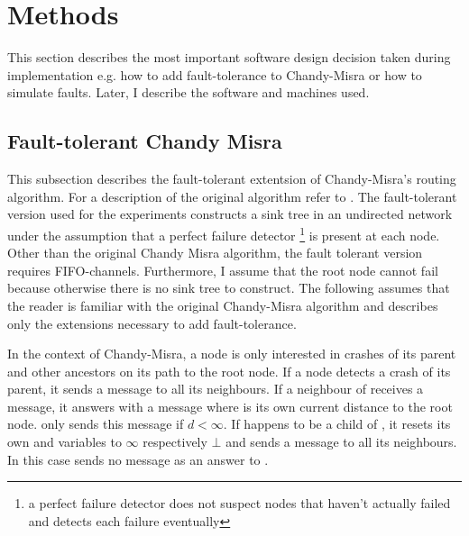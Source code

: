 \section{Methods}
\label{sec:methods}
This section describes the most important software design decision taken during implementation e.g. how to add fault-tolerance to Chandy-Misra or how to simulate faults.
Later, I describe the software and machines used.

\subsection {Fault-tolerant Chandy Misra}
\label{ssec:fault-tolerant-chandy-misra}
This subsection describes the fault-tolerant extentsion of Chandy-Misra's routing algorithm.
For a description of the original algorithm refer to \cite[page 56]{Fokkink:2018}.
The fault-tolerant version used for the experiments constructs a sink tree in an undirected network under the assumption that a perfect failure detector \footnote{a perfect failure detector does not suspect nodes that haven't actually failed and detects each failure eventually} is present at each node.
Other than the original Chandy Misra algorithm, the fault tolerant version requires FIFO-channels.
Furthermore, I assume that the root node cannot fail because otherwise there is no sink tree to construct.
The following assumes that the reader is familiar with the original Chandy-Misra algorithm and describes only the extensions necessary to add fault-tolerance.

In the context of Chandy-Misra, a node is only interested in crashes of its parent and other ancestors on its path to the root node.
If a node  detects a crash of its parent, it sends a  message to all its neighbours.
If a neighbour  of  receives a  message, it answers with a  message where  is its own current distance to the root node.
 only sends this message if $d < \infty $.
If  happens to be a child of , it resets its own  and  variables to $\infty$ respectively $\bot$ and sends a  message to all its neighbours.
In this case  sends no  message as an answer to .


